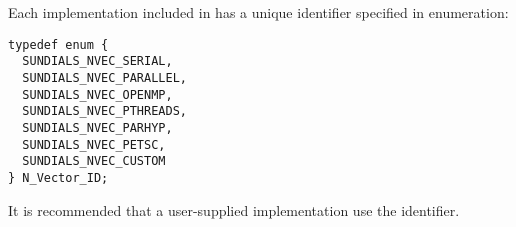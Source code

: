 Each {\nvector} implementation included in {\sundials} has a unique 
identifier specified in enumeration:
\begin{verbatim}
typedef enum {
  SUNDIALS_NVEC_SERIAL, 
  SUNDIALS_NVEC_PARALLEL, 
  SUNDIALS_NVEC_OPENMP, 
  SUNDIALS_NVEC_PTHREADS, 
  SUNDIALS_NVEC_PARHYP, 
  SUNDIALS_NVEC_PETSC,
  SUNDIALS_NVEC_CUSTOM
} N_Vector_ID; 
\end{verbatim}
It is recommended that a user-supplied {\nvector} implementation use the 
 identifier.

\newpage

\newlength{\colone}
\newlength{\coltwo}
\setlength{\coltwo}{\textwidth}
\addtolength{\coltwo}{-0.5in}
\addtolength{\coltwo}{-\colone}

